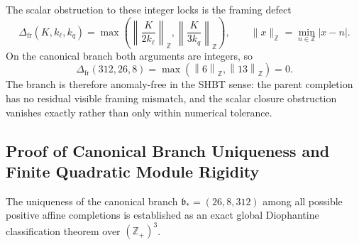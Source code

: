 \documentclass[11pt,letterpaper]{article}
\theoremstyle{plain}
\newcommand{\branchstar}{\mathfrak b_*}
\newcommand{\kell}{k_{\ell}}
\newcommand{\kq}{k_q}
\newcommand{\Kpar}{K}
\newcommand{\Deltafr}{\Delta_{\text{fr}}}
\begin{document}
The scalar obstruction to these integer locks is the framing defect
\begin{equation}
\label{eq:section-two-framing-defect}
 \boxed{
 \Deltafr(\Kpar,\kell,\kq)
 =
 \max\!\left(
 \left\|\frac{\Kpar}{2\kell}\right\|_{\mathbb Z},
 \left\|\frac{\Kpar}{3\kq}\right\|_{\mathbb Z}
 \right),}
 \qquad
 \|x\|_{\mathbb{Z}}=\min_{n\in\mathbb{Z}}|x-n|.
\end{equation}
On the canonical branch both arguments are integers, so
\begin{equation}
\label{eq:section-two-framing-defect-zero}
 \Deltafr(312,26,8)
 =
 \max\!\left(
 \left\|6\right\|_{\mathbb Z},
 \left\|13\right\|_{\mathbb Z}
 \right)
 =0.
\end{equation}
The branch is therefore anomaly-free in the SHBT sense: the parent completion
has no residual visible framing mismatch, and the scalar closure obstruction
vanishes exactly rather than only within numerical tolerance.

\subsection{Proof of Canonical Branch Uniqueness and Finite Quadratic Module Rigidity}
\label{sec:canonical-branch-uniqueness-proof}

The uniqueness of the canonical branch $\branchstar = (26, 8, 312)$ among all possible positive affine completions is established as an exact global Diophantine classification theorem over $(\mathbb{Z}_+)^3$.
\end{document}
